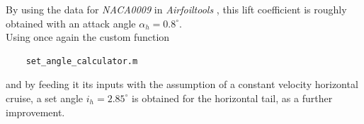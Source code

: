\documentclass{article}
\begin{document}
By using the data for \textit{NACA0009} in \textit{Airfoiltools} \autocite{Airfoiltools}, this lift coefficient
is roughly obtained with an attack angle $\alpha_h = 0.8^{\circ}$. \\ 

Using once again the custom function \autocite{Airbus_replacement_repo}

\begin{verbatim}
    set_angle_calculator.m
\end{verbatim}

and by feeding it its inputs with the assumption of a constant velocity horizontal cruise, 
a set angle $i_h = 2.85^{\circ}$ is obtained for the horizontal tail, as a further improvement.
\pagebreak
\printbibliography
    
\end{document}
